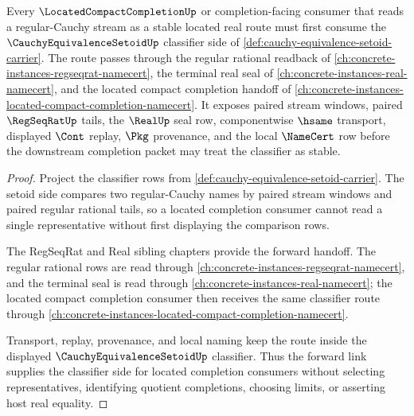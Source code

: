 \begin{theorem}
\label{thm:cauchy-equivalence-setoid-located-completion-forward-link}
Every $\LocatedCompactCompletionUp$ or completion-facing consumer that reads a regular-Cauchy stream as a stable located real route must first consume the $\CauchyEquivalenceSetoidUp$ classifier side of \autoref{def:cauchy-equivalence-setoid-carrier}. The route passes through the regular rational readback of \autoref{ch:concrete-instances-regseqrat-namecert}, the terminal real seal of \autoref{ch:concrete-instances-real-namecert}, and the located compact completion handoff of \autoref{ch:concrete-instances-located-compact-completion-namecert}. It exposes paired stream windows, paired $\RegSeqRatUp$ tails, the $\RealUp$ seal row, componentwise $\hsame$ transport, displayed $\Cont$ replay, $\Pkg$ provenance, and the local $\NameCert$ row before the downstream completion packet may treat the classifier as stable.
\end{theorem}
\begin{proof}
Project the classifier rows from \autoref{def:cauchy-equivalence-setoid-carrier}. The setoid side compares two regular-Cauchy names by paired stream windows and paired regular rational tails, so a located completion consumer cannot read a single representative without first displaying the comparison rows.

The RegSeqRat and Real sibling chapters provide the forward handoff. The regular rational rows are read through \autoref{ch:concrete-instances-regseqrat-namecert}, and the terminal seal is read through \autoref{ch:concrete-instances-real-namecert}; the located compact completion consumer then receives the same classifier route through \autoref{ch:concrete-instances-located-compact-completion-namecert}.

Transport, replay, provenance, and local naming keep the route inside the displayed $\CauchyEquivalenceSetoidUp$ classifier. Thus the forward link supplies the classifier side for located completion consumers without selecting representatives, identifying quotient completions, choosing limits, or asserting host real equality.
\end{proof}
